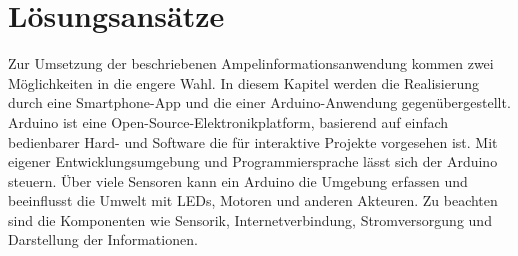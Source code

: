 \chapter{\label{chap:entscheidung}Lösungsansätze}
Zur Umsetzung der beschriebenen Ampelinformationsanwendung kommen zwei Möglichkeiten in die engere Wahl. In diesem Kapitel werden die Realisierung durch eine \gls{Smartphone}-\Gls{App} und die einer \gls{Arduino}-Anwendung gegenübergestellt. 
Arduino ist eine Open-Source-Elektronikplatform, basierend auf einfach bedienbarer Hard- und Software die für interaktive Projekte vorgesehen ist. Mit eigener Entwicklungsumgebung und Programmiersprache lässt sich der Arduino steuern. Über viele Sensoren kann ein Arduino die Umgebung erfassen und beeinflusst die Umwelt mit \glspl{LED}, Motoren und anderen Akteuren. \cite{arduino_about}
Zu beachten sind die Komponenten wie Sensorik, Internetverbindung, Stromversorgung und Darstellung der Informationen.\\
